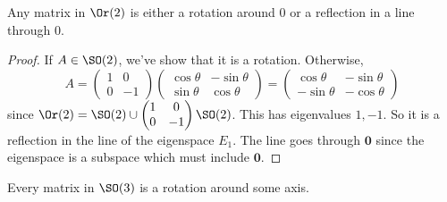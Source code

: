 \documentclass[a4paper]{article}
\begin{document}
\begin{cor}
  Any matrix in $\Or(2)$ is either a rotation around $0$ or a reflection in a line through $0$.
\end{cor}

\begin{proof}
  If $A\in \SO(2)$, we've show that it is a rotation. Otherwise,
  \[
    A =
    \begin{pmatrix}
      1 & 0\\
      0 & -1
    \end{pmatrix}
    \begin{pmatrix}
      \cos\theta & -\sin\theta\\
      \sin\theta & \cos\theta
    \end{pmatrix} =
    \begin{pmatrix}
      \cos\theta & -\sin\theta \\
      -\sin\theta & -\cos\theta
    \end{pmatrix}
  \]
  since $\Or(2) = \SO(2)\cup
  \begin{pmatrix}
    1&0\\0&-1
  \end{pmatrix}\SO(2)$. This has eigenvalues $1, -1$. So it is a reflection in the line of the eigenspace $E_1$. The line goes through $\mathbf{0}$ since the eigenspace is a subspace which must include $\mathbf{0}$.
\end{proof}

\begin{lemma}
  Every matrix in $\SO(3)$ is a rotation around some axis.
\end{lemma}
\end{document}

